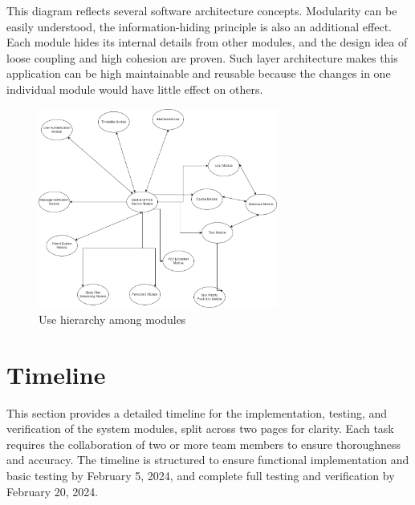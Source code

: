 \documentclass[12pt, titlepage]{article}
\begin{document}
This diagram reflects several software architecture concepts. Modularity can be easily understood, the information-hiding principle is also an additional effect.  Each module hides its internal details from other modules, and the design idea of loose coupling and high cohesion are proven. Such layer architecture makes this application can be high maintainable and reusable because the changes in one individual module would have little effect on others. 
\begin{figure}[H]
\centering
\includegraphics[width=0.7\textwidth]{UseHierachy.png}
\caption{Use hierarchy among modules}
\label{FigUH}
\end{figure}

\section{Timeline}

This section provides a detailed timeline for the implementation, testing, and verification of the system modules, split across two pages for clarity. Each task requires the collaboration of two or more team members to ensure thoroughness and accuracy. The timeline is structured to ensure functional implementation and basic testing by February 5, 2024, and complete full testing and verification by February 20, 2024.
\end{document}

